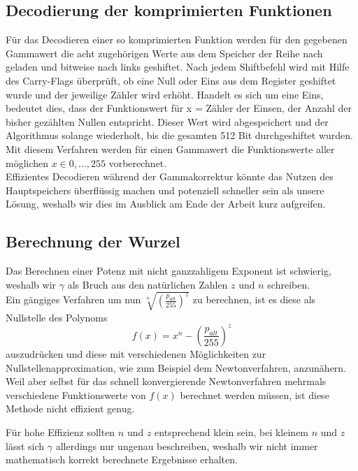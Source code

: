 \documentclass[course=erap]{aspdoc}
\begin{document}
	\subsection{Decodierung der komprimierten Funktionen}
	Für das Decodieren einer so komprimierten Funktion werden für den gegebenen Gammawert die acht zugehörigen Werte aus dem Speicher der Reihe nach geladen und bitweise nach links geshiftet. Nach jedem Shiftbefehl wird mit Hilfe des Carry-Flags überprüft, ob eine Null oder Eins aus dem Register geshiftet wurde und der jeweilige Zähler wird erhöht. Handelt es sich um eine Eins, bedeutet dies, dass der Funktionswert für x = Zähler der Einsen, der Anzahl der bisher gezählten Nullen entspricht. Dieser Wert wird abgespeichert und der Algorithmus solange wiederholt, bis die gesamten 512 Bit durchgeshiftet wurden. Mit diesem Verfahren werden für einen Gammawert die Funktionswerte aller möglichen $x\in{0,...,255}$ vorberechnet.\\
	Effizientes Decodieren während der Gammakorrektur könnte das Nutzen des Hauptspeichers überflüssig machen und potenziell schneller sein als unsere Lösung, weshalb wir dies im Ausblick am Ende der Arbeit kurz aufgreifen.

	\subsection{Berechnung der Wurzel}
	Das Berechnen einer Potenz mit nicht ganzzahligem Exponent ist schwierig, weshalb wir $\gamma$ als Bruch aus den natürlichen Zahlen $z$ und $n$ schreiben.\\
	
	\noindent Ein gängiges Verfahren um nun $\sqrt[n]{\left(\frac{p_{alt}}{255}\right)^{z}}$ zu berechnen, ist es diese als Nullstelle des Polynoms 
	\begin{equation}
	\label{(4)}
	f(x) = {x}^{n} - \left(\frac{p_{alt}}{255}\right)^{z}
	\end{equation}
	 auszudrücken und diese mit verschiedenen Möglichkeiten zur Nullstellenapproximation, wie zum Beispiel dem Newtonverfahren, anzunähern. Weil aber selbst für das schnell konvergierende Newtonverfahren mehrmals verschiedene Funktionswerte von $f(x)$ berechnet werden müssen, ist diese Methode nicht effizient genug.
	
	\noindent Für hohe Effizienz sollten $n$ und $z$ entsprechend klein sein, bei kleinem $n$ und $z$ lässt sich $\gamma$ allerdings nur ungenau beschreiben, weshalb wir nicht immer mathematisch korrekt berechnete Ergebnisse erhalten.
	
\end{document}
